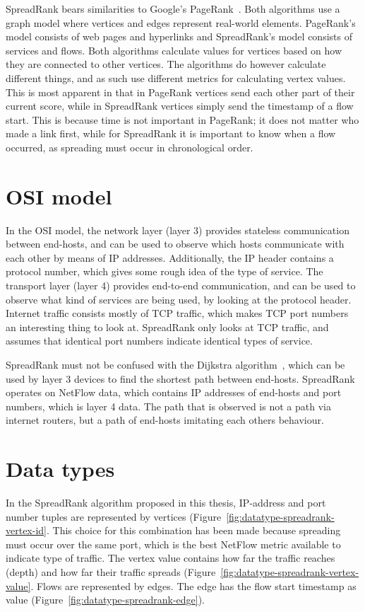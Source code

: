SpreadRank bears similarities to Google's PageRank~\cite{page1999pagerank}.
Both algorithms use a graph model where vertices and edges represent real-world elements.
PageRank's model consists of web pages and hyperlinks and
 SpreadRank's model consists of services and flows.
Both algorithms calculate values for vertices based on how they are connected to other vertices.
The algorithms do however calculate different things,
 and as such use different metrics for calculating vertex values.
This is most apparent in that in PageRank vertices send each other part of their current score,
 while in SpreadRank vertices simply send the timestamp of a flow start.
This is because time is not important in PageRank; it does not matter who made a link first,
 while for SpreadRank it is important to know when a flow occurred,
 as spreading must occur in chronological order.


\section{OSI model}
In the OSI model, the network layer (layer 3) provides stateless communication between end-hosts, and can be used to observe which hosts communicate with each other by means of IP addresses.
Additionally, the IP header contains a protocol number, which gives some rough idea of the type of service.
The transport layer (layer 4) provides end-to-end communication, and can be used to observe what kind of services are being used, by looking at the protocol header.
Internet traffic consists mostly of TCP traffic, which makes TCP port numbers an interesting thing to look at.
SpreadRank only looks at TCP traffic, and assumes that identical port numbers indicate identical types of service.

SpreadRank must not be confused with the Dijkstra algorithm~\cite{dijkstra1959note},
 which can be used by layer 3 devices to find the shortest path between end-hosts.
SpreadRank operates on NetFlow data, which contains IP addresses of end-hosts and port numbers, which is layer 4 data.
The path that is observed is not a path via internet routers, but a path of end-hosts imitating each others behaviour.


\section{Data types}
\label{sec:data-types}
In the SpreadRank algorithm proposed in this thesis,
 IP-address and port number tuples are represented by vertices (Figure~\ref{fig:datatype-spreadrank-vertex-id}.
This choice for this combination has been made because spreading must occur over the same port, which is the best NetFlow metric available to indicate type of traffic.
The vertex value contains how far the traffic reaches (depth) and how far their traffic spreads (Figure~\ref{fig:datatype-spreadrank-vertex-value}.
Flows are represented by edges.
The edge has the flow start timestamp as value (Figure~\ref{fig:datatype-spreadrank-edge}).


